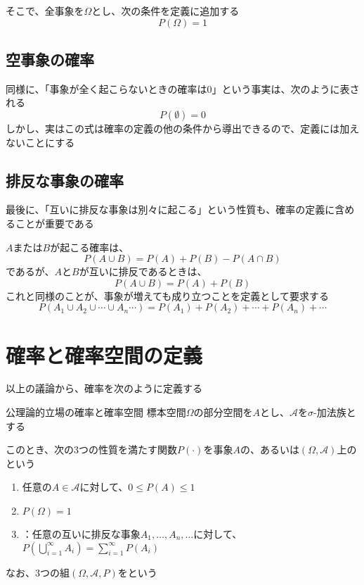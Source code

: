 \documentclass[../../../topic_probability-statistics]{subfiles}
\begin{document}
そこで、全事象を$\Omega$とし、次の条件を定義に追加する
\begin{equation*}
  P(\Omega) = 1
\end{equation*}

\subsection{空事象の確率}

同様に、「事象が全く起こらないときの確率は0」という事実は、次のように表される
\begin{equation*}
  P(\emptyset) = 0
\end{equation*}
しかし、実はこの式は確率の定義の他の条件から導出できるので、定義には加えないことにする

\subsection{排反な事象の確率}

最後に、「互いに排反な事象は別々に起こる」という性質も、確率の定義に含めることが重要である

\br

$A$または$B$が起こる確率は、
\begin{equation*}
  P(A \cup B) = P(A) + P(B) - P(A \cap B)
\end{equation*}
であるが、$A$と$B$が互いに排反であるときは、
\begin{equation*}
  P(A \cup B) = P(A) + P(B)
\end{equation*}
これと同様のことが、事象が増えても成り立つことを定義として要求する
\begin{equation*}
  P(A_1 \cup A_2 \cup \cdots \cup A_n \cdots) = P(A_1) + P(A_2) + \cdots + P(A_n) + \cdots
\end{equation*}

\sectionline
\section{確率と確率空間の定義}

以上の議論から、確率を次のように定義する

\begin{definition}{公理論的立場の確率と確率空間}
  標本空間$\Omega$の部分空間を$A$とし、$\mathscr{A}$を$\sigma$-加法族とする

  このとき、次の3つの性質を満たす関数$P(\cdot)$を事象$A$の、あるいは$(\Omega, \mathscr{A})$上のという
  \begin{enumerate}[label=\romanlabel]
    \item 任意の$A \in \mathscr{A}$に対して、$0 \leq P(A) \leq 1$
    \item $P(\Omega) = 1$
    \item {}：任意の互いに排反な事象$A_1, \ldots, A_n, \ldots$に対して、$\displaystyle P\left(\bigcup_{i=1}^\infty A_i\right) = \sum_{i=1}^\infty P(A_i)$
  \end{enumerate}

  なお、3つの組$(\Omega, \mathscr{A}, P)$をという
\end{definition}
\end{document}

